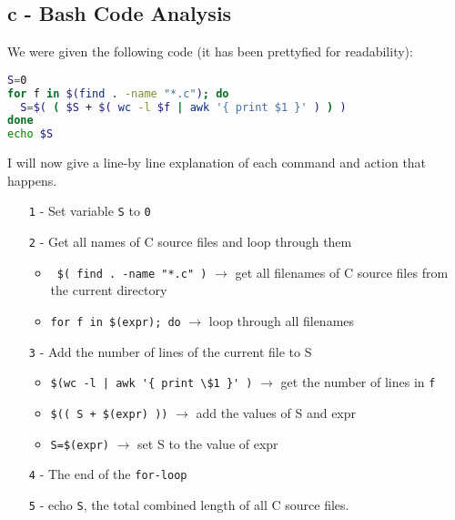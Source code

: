 \documentclass[a4paper, 11pt]{article}
\begin{document}
    \subsection{c - Bash Code Analysis}
    We were given the following code (it has been prettyfied for readability):
    \begin{lstlisting}[language=Bash,caption={}]
S=0
for f in $(find . -name "*.c"); do
  S=$( ( $S + $( wc -l $f | awk '{ print $1 }' ) ) )
done
echo $S
    \end{lstlisting}
    I will now give a line-by line explanation of each command and action that happens.
    \begin{enumerate}
      \item[\texttt{1} -] Set variable \texttt{S} to \texttt{0} 
      \item[\texttt{2} -] Get all names of C source files and loop through them
        \begin{itemize}
          \item \lstinline{ $( find . -name "*.c" )}  $\rightarrow$ get all filenames of C source files from the current directory 
          \item \lstinline{for f in $(expr); do} $\rightarrow$ loop through all filenames
        \end{itemize} 
      \item[\texttt{3} -] Add the number of lines of the current file to S
        \begin{itemize}
          \item \lstinline+$(wc -l | awk '{ print \$1 }' )+ $\rightarrow$ get the number of lines in \texttt{f}
          \item \lstinline{$(( S + $(expr) ))} $\rightarrow$ add the values of S and expr
          \item \lstinline{S=$(expr)} $\rightarrow$ set S to the value of expr
        \end{itemize}
      \item[\texttt{4} -] The end of the \texttt{for-loop}
      \item[\texttt{5} -] echo \texttt{S}, the total combined length of all C source files.
    \end{enumerate}
    
\end{document}
